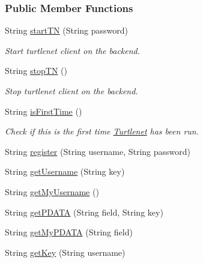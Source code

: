 \subsubsection*{Public Member Functions}
\begin{DoxyCompactItemize}
\item 
String \hyperlink{interfaceballmerpeak_1_1turtlenet_1_1client_1_1Turtlenet_ad2c185cc33495082c8da75b56de3923d}{start\-T\-N} (String password)
\begin{DoxyCompactList}\small\item\em Start turtlenet client on the backend. \end{DoxyCompactList}\item 
String \hyperlink{interfaceballmerpeak_1_1turtlenet_1_1client_1_1Turtlenet_ab9c5f257cca5e02901ffd588965963be}{stop\-T\-N} ()
\begin{DoxyCompactList}\small\item\em Stop turtlenet client on the backend. \end{DoxyCompactList}\item 
String \hyperlink{interfaceballmerpeak_1_1turtlenet_1_1client_1_1Turtlenet_af9208c1d9cb46ce3470a33df4a1a4df9}{is\-First\-Time} ()
\begin{DoxyCompactList}\small\item\em Check if this is the first time \hyperlink{interfaceballmerpeak_1_1turtlenet_1_1client_1_1Turtlenet}{Turtlenet} has been run. \end{DoxyCompactList}\item 
String \hyperlink{interfaceballmerpeak_1_1turtlenet_1_1client_1_1Turtlenet_ad64cfc9925dcd72033616bbdb04949a0}{register} (String username, String password)
\item 
String \hyperlink{interfaceballmerpeak_1_1turtlenet_1_1client_1_1Turtlenet_a7be22b6c4de115ee3842215390327a01}{get\-Username} (String key)
\item 
String \hyperlink{interfaceballmerpeak_1_1turtlenet_1_1client_1_1Turtlenet_a1403ccfe05dbc6d8c1634b9ee495db15}{get\-My\-Username} ()
\item 
String \hyperlink{interfaceballmerpeak_1_1turtlenet_1_1client_1_1Turtlenet_ad8ee0ed3492a6014119f93e924f7e08c}{get\-P\-D\-A\-T\-A} (String field, String key)
\item 
String \hyperlink{interfaceballmerpeak_1_1turtlenet_1_1client_1_1Turtlenet_a6e1aec0d0b894cc034a058e6a1e59f8d}{get\-My\-P\-D\-A\-T\-A} (String field)
\item 
String \hyperlink{interfaceballmerpeak_1_1turtlenet_1_1client_1_1Turtlenet_a1e027a6781273a6004088c007652bbfb}{get\-Key} (String username)

\end{DoxyCompactItemize}
